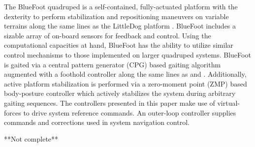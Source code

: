 		The BlueFoot quadruped is a self-contained, fully-actuated platform with the dexterity to perform stabilization and  repositioning maneuvers on variable terrains along the same lines as the LittleDog platform \cite{Rebula2007}. BlueFoot includes a sizable array of on-board sensors for feedback and control. Using the computational capacities at hand, BlueFoot has the ability to utilize similar control mechanisms to those implemented on larger quadruped systems. BlueFoot is  gaited via a central pattern generator (CPG) based gaiting algorithm augmented with a foothold controller along the same lines as \cite{Ajallooeian2013} and \cite{Rutishauser2008}. Additionally, active platform stabilization is performed via a zero-moment point (ZMP) based body-posture controller which actively stabilizes the system during arbitrary gaiting sequences. The controllers presented in this paper make use of virtual-forces to drive system reference commands. An outer-loop controller supplies commands and corrections used in system navigation control.

**Not complete**